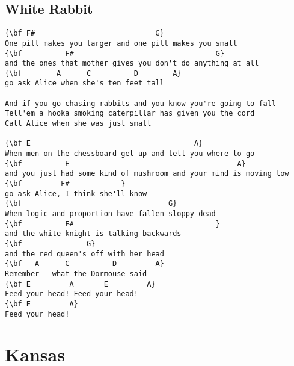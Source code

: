 \documentclass[a4paper]{article}
\begin{document}
\subsection{White Rabbit} %
\label{sub:White Rabbi}
\begin{Verbatim}[commandchars=\\\{\}]
{\bf F#                            G}
One pill makes you larger and one pill makes you small
{\bf          F#                                 G}
and the ones that mother gives you don't do anything at all
{\bf        A      C          D        A}
go ask Alice when she's ten feet tall

And if you go chasing rabbits and you know you're going to fall
Tell'em a hooka smoking caterpillar has given you the cord
Call Alice when she was just small

{\bf E                                      A}
When men on the chessboard get up and tell you where to go
{\bf          E                                       A}
and you just had some kind of mushroom and your mind is moving low
{\bf         F#            }
go ask Alice, I think she'll know
{\bf                                  G}
When logic and proportion have fallen sloppy dead
{\bf          F#                                 }
and the white knight is talking backwards 
{\bf               G}
and the red queen's off with her head
{\bf   A      C          D         A}
Remember   what the Dormouse said
{\bf E         A       E         A}
Feed your head! Feed your head!
{\bf E         A}
Feed your head!
\end{Verbatim}
\newpage
\section{Kansas} %
\label{sec:Kansas}
\end{document}

